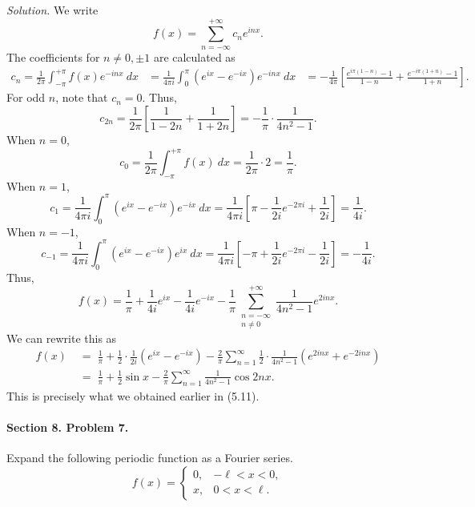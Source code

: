 \documentclass[10pt]{article}
\begin{document}
        \textit{Solution.} We write
        \[
                f(x) = \sum_{n = -\infty}^{+\infty} c_n e^{inx}.
        \]
        The coefficients for $n \neq 0, \pm 1$ are calculated as
        \begin{align*}
                c_n = \frac{1}{2\pi} \int_{-\pi}^{+\pi} f(x)e^{-inx}\:dx &= \frac{1}{4\pi i}\int_0^\pi (e^{ix} - e^{-ix}) e^{-inx}\: dx 
                        &= -\frac{1}{4\pi}\left[\frac{e^{i\pi(1 - n)} - 1}{1 - n} + \frac{e^{-i\pi(1 + n)} - 1}{1 + n}\right].
        \end{align*}
        For odd $n$, note that $c_n = 0$. Thus,
        \[
                c_{2n} = \frac{1}{2\pi}\left[\frac{1}{1 - 2n} + \frac{1}{1 + 2n}\right] = -\frac{1}{\pi}\cdot \frac{1}{4n^2 - 1}.
        \]
        When $n = 0$,
        \[
                c_0 = \frac{1}{2\pi}\int_{-\pi}^{+\pi} f(x)\:dx = \frac{1}{2\pi}\cdot 2 = \frac{1}{\pi}.
        \]
        When $n = 1$,
        \[
                c_1 = \frac{1}{4\pi i}\int_{0}^{\pi} (e^{ix} - e^{-ix})e^{-ix}\:dx = \frac{1}{4\pi i}\left[\pi - \frac{1}{2i}e^{-2\pi i} + 
                        \frac{1}{2i}\right] = \frac{1}{4i}.
        \]
        When $n = -1$,
        \[
                c_{-1} = \frac{1}{4\pi i}\int_{0}^{\pi} (e^{ix} - e^{-ix})e^{ix}\:dx = \frac{1}{4\pi i}\left[-\pi + \frac{1}{2i}e^{-2\pi i} - 
                        \frac{1}{2i}\right] = -\frac{1}{4i}.
        \]
        Thus,
        \[
                f(x) = \frac{1}{\pi} + \frac{1}{4i}e^{ix} - \frac{1}{4i}e^{-ix} - \frac{1}{\pi}\sum_{\substack{n = -\infty\\ n \neq 0}}^{+\infty} 
                        \frac{1}{4n^2 - 1}e^{2inx}.
        \]
        We can rewrite this as 
        \begin{align*}
                f(x) \;&=\; \frac{1}{\pi} + \frac{1}{2}\cdot \frac{1}{2i}(e^{ix} - e^{-ix}) - \frac{2}{\pi}\sum_{n = 1}^\infty
                        \frac{1}{2}\cdot \frac{1}{4n^2 - 1}(e^{2inx} + e^{-2inx}) \\
                        \;&=\; \frac{1}{\pi} + \frac{1}{2}\sin{x} - \frac{2}{\pi}\sum_{n = 1}^\infty \frac{1}{4n^2 - 1}\cos{2nx}.
        \end{align*}
        This is precisely what we obtained earlier in (5.11).
        
        \paragraph{Section 8. Problem 7.} Expand the following periodic function as a Fourier series.
        \[
                f(x) = \begin{cases}
                        0, & -\ell < x < 0,      \\
                        x, & 0 < x < \ell.
                \end{cases}
        \]
        
\end{document}
